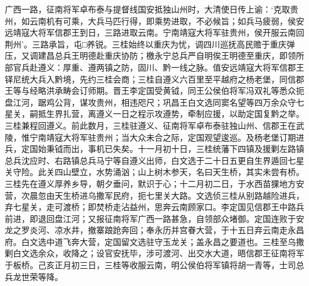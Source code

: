 \documentclass[]{article}
\begin{document}
广西一路，征南将军卓布泰与提督线国安抵独山州时，大清使日传上谕：`克取贵州，如云南机有可乘，大兵马匹行得，即乘势进取，不必候旨；如兵马疲弱，侯安远靖寇大将军信郡王到日，三路进取云南。宁南靖寇大将军驻贵州，侯开服云南回荆州'。三路承旨，屯□养锐。三桂始终以重庆为忧，调四川巡抚高民赡于重庆弹压，又调建昌总兵王明德赴重庆协防；檄永宁总兵严自明俟王明德至重庆，即领所部官兵赴遵义：厚重、遵两镇之防，固川、黔一线之脉。值安远靖寇大将军信郡王铎尼统大兵入黔境，先约三桂会商；三桂自遵义六百里至平越府之杨老堡，同信郡王等与经略洪承畴会订师期。晋王李定国受黄钺，同王公侯伯将军冯双礼等悉众扼盘江河，踞鸡公背，谋攻贵州，相违咫尺；巩昌王白文选同窦名望等四万余众守七星关，嗣抵生界扎营，离遵义一日之程示攻遵势，牵制应援，以助定国复黔之举。三桂兼程回遵义。前此数月，三桂驻遵义、征南将军卓布泰驻独山州、信郡王在武陵，惟宁南靖寇大将军驻贵州；当大众未合之际，定国观望逡巡。及杨老堡订期进兵，定国始秉钺而出，事机已失矣。十一月初十日，三桂统藩下四镇及援剿左路镇总兵沈应时、右路镇总兵马宁等自遵义出师，白文选于二十日五更自生界遁回七星关守险。此关四山壁立，水势涌汹；山上树木参天，名曰天生桥，其实未尝有桥。三桂先在遵义厚养乡导，朝夕垂问，默识于心；十二月初二日，于水西苗猓地方安营，次晨忽由天生桥进乌撒军民府，扼七里关大路。文选侦三桂从别路越险进兵，弃七星关，走可渡桥；即焚桥走沾益州，思奔云南顾家口。李定国见信郡王中路兵前进，即退回盘江河；又报征南将军广西一路甚急，自领部众堵御。定国连败于安龙之罗炎河、凉水井，撤寨踉跄奔回；奉永历并宫眷大营，于十五日弃云南走永昌府。白文选中道飞奔大营，定国留文选驻守玉龙关；盖永昌之要道也。三桂至乌撒剿白文选余众，收降之；设官安抚毕，涉可渡河、出交水大道，晤信郡王征南将军于板桥。己亥正月初三日，三桂等收服云南，明公侯伯将军镇将胡一青等，士司总兵龙世荣等降。
\end{document}
